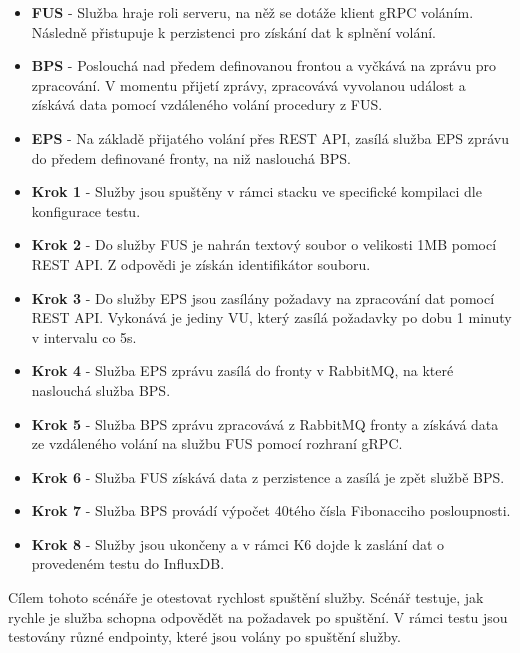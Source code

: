 \begin{itemize}
    \item \textbf{FUS} - Služba hraje roli serveru, na něž se dotáže klient gRPC voláním. Následně přistupuje k perzistenci pro získání dat k splnění volání.
    \item \textbf{BPS} - Poslouchá nad předem definovanou frontou a vyčkává na zprávu pro zpracování. V momentu přijetí zprávy, zpracovává vyvolanou událost a získává data pomocí vzdáleného volání procedury z FUS.
    \item \textbf{EPS} - Na základě přijatého volání přes REST API, zasílá služba EPS zprávu do předem definované fronty, na niž naslouchá BPS.
\end{itemize}


\begin{itemize}
    \item \textbf{Krok 1} - Služby jsou spuštěny v rámci stacku ve specifické kompilaci dle konfigurace testu.
    \item \textbf{Krok 2} - Do služby FUS je nahrán textový soubor o velikosti 1MB pomocí REST API. Z odpovědi je získán identifikátor souboru.
    \item \textbf{Krok 3} - Do služby EPS jsou zasílány požadavy na zpracování dat pomocí REST API. Vykonává je jediny VU, který zasílá požadavky po dobu 1 minuty v intervalu co 5s.
    \item \textbf{Krok 4} - Služba EPS zprávu zasílá do fronty v RabbitMQ, na které naslouchá služba BPS. 
    \item \textbf{Krok 5} - Služba BPS zprávu zpracovává z RabbitMQ fronty a získává data ze vzdáleného volání na službu FUS pomocí rozhraní gRPC. 
    \item \textbf{Krok 6} - Služba FUS získává data z perzistence a zasílá je zpět službě BPS. 
    \item \textbf{Krok 7} - Služba BPS provádí výpočet 40tého čísla Fibonacciho posloupnosti.
    \item \textbf{Krok 8} - Služby jsou ukončeny a v rámci K6 dojde k zaslání dat o provedeném testu do InfluxDB.
\end{itemize}


Cílem tohoto scénáře je otestovat rychlost spuštění služby. Scénář testuje, jak rychle je služba schopna odpovědět na požadavek po spuštění. V rámci testu jsou testovány různé endpointy, které jsou volány po spuštění služby.


